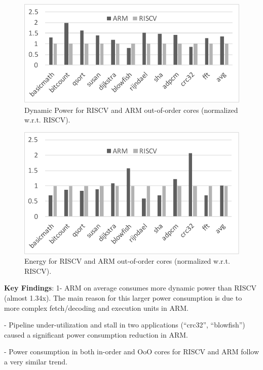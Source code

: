 \begin{figure}[]
	\centering
	\includegraphics[width=1\columnwidth]{figures/power.pdf}
	\caption{Dynamic Power for RISCV and ARM out-of-order cores (normalized w.r.t. RISCV).}
	\label{fig:pow}
	\vspace{-1em}
\end{figure} 

\begin{figure}[]
	\centering
	\includegraphics[width=1\columnwidth]{figures/energy.pdf}
	\caption{Energy for RISCV and ARM out-of-order cores (normalized w.r.t. RISCV).}
	\label{fig:ener}
	\vspace{-1em}
\end{figure} 

\noindent \textbf{Key Findings}: 1- ARM on average consumes more dynamic power than RISCV (almost 1.34x). The main reason for this larger power consumption is due to more complex fetch/decoding and execution units in ARM. 

- Pipeline under-utilization and stall in two applications (``crc32'', ``blowfish'') caused a significant power consumption reduction in ARM. 

- Power consumption in both in-order and OoO cores for RISCV and ARM follow a very similar trend. \\


